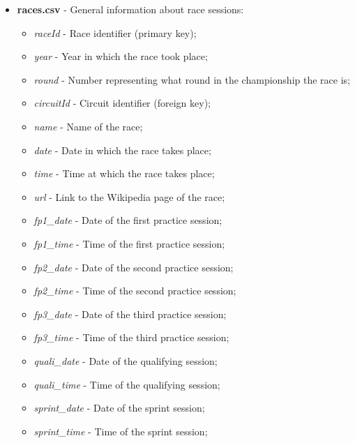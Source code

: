 \documentclass{Configuration_Files/PoliMi3i_thesis}
\begin{document}
\begin{itemize}
    \item \textbf{races.csv} - General information about race sessions:
    \begin{itemize}
        \item \textit{raceId} - Race identifier (primary key);
        \item \textit{year} - Year in which the race took place;
        \item \textit{round} - Number representing what round in the championship the race is;
        \item \textit{circuitId} - Circuit identifier (foreign key);
        \item \textit{name} - Name of the race;
        \item \textit{date} - Date in which the race takes place;
        \item \textit{time} - Time at which the race takes place;
        \item \textit{url} - Link to the Wikipedia page of the race;
        \item \textit{fp1\_date} - Date of the first practice session;
        \item \textit{fp1\_time} - Time of the first practice session;
        \item \textit{fp2\_date} - Date of the second practice session;
        \item \textit{fp2\_time} - Time of the second practice session;
        \item \textit{fp3\_date} - Date of the third practice session;
        \item \textit{fp3\_time} - Time of the third practice session;
        \item \textit{quali\_date} - Date of the qualifying session;
        \item \textit{quali\_time} - Time of the qualifying session;
        \item \textit{sprint\_date} - Date of the sprint session;
        \item \textit{sprint\_time} - Time of the sprint session;
    \end{itemize}


\end{itemize}
\end{document}
